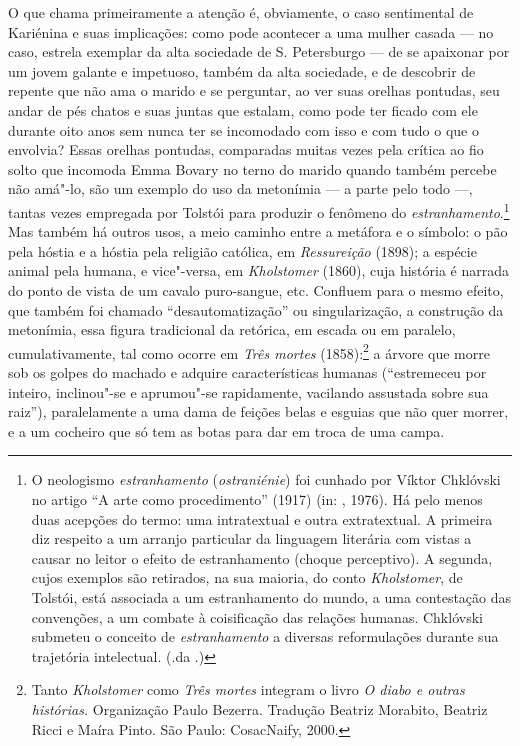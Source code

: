 O que chama primeiramente a atenção é, obviamente, o caso sentimental de
Kariénina e suas implicações: como pode acontecer a uma mulher
casada --- no caso, estrela exemplar da alta sociedade de S.
Petersburgo --- de se apaixonar por um jovem galante e impetuoso, também
da alta sociedade, e de descobrir de repente que não ama o marido e se
perguntar, ao ver suas orelhas pontudas, seu andar de pés chatos e suas
juntas que estalam, como pode ter ficado com ele durante oito anos sem
nunca ter se incomodado com isso e com tudo o que o envolvia? Essas orelhas
pontudas, comparadas muitas vezes pela crítica ao fio solto que incomoda
Emma Bovary no terno do marido quando também percebe não amá"-lo, são um
exemplo do uso da metonímia --- a parte pelo todo ---, tantas
vezes empregada por Tolstói para produzir o fenômeno do \emph{estranhamento}.\footnote{O neologismo \emph{estranhamento} (\emph{ostraniénie}) foi cunhado por Víktor Chklóvski no artigo “A arte como procedimento” (1917) (in: , 1976). Há pelo menos duas acepções do termo: uma intratextual e outra extratextual.
A primeira diz respeito a um arranjo particular da linguagem literária com vistas a causar no leitor o efeito de estranhamento (choque perceptivo). A segunda, cujos exemplos são retirados, na sua maioria, do conto \emph{Kholstomer}, de
Tolstói, está associada a um estranhamento do mundo, a uma contestação das convenções, a um combate à coisificação das relações humanas. Chklóvski submeteu o conceito de \emph{estranhamento} a diversas reformulações durante sua trajetória intelectual. (.da .)}
Mas também há outros usos, a meio caminho entre a metáfora e o símbolo:
o pão pela hóstia e a hóstia pela religião católica,
em \emph{Ressureição} (1898); a espécie animal pela
humana, e vice"-versa, em \emph{Kholstomer} (1860),
cuja história é narrada do ponto de vista de um cavalo puro-sangue, etc. Confluem para o
mesmo efeito, que também foi chamado ``desautomatização'' ou
singularização, a construção da metonímia, essa figura tradicional da
retórica, em escada ou em paralelo, cumulativamente, tal como
ocorre em \emph{Três mortes} (1858):\footnote{Tanto \emph{Kholstomer} como \emph{Três mortes} integram o livro
\emph{O diabo e outras histórias.} Organização Paulo Bezerra. Tradução Beatriz
Morabito, Beatriz Ricci e Maíra Pinto. São Paulo: CosacNaify, 2000.} a árvore que morre sob os golpes
do machado e adquire características humanas (``estremeceu por
inteiro, inclinou"-se e aprumou"-se rapidamente, vacilando assustada sobre
sua raiz''), paralelamente a uma dama de feições belas e esguias que
não quer morrer, e a um cocheiro que só tem as botas para dar em troca
de uma campa.

